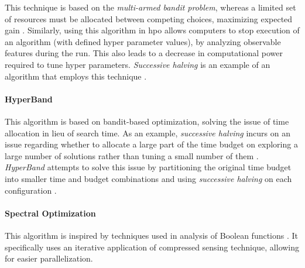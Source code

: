 This technique is based on the \textit{multi-armed bandit problem}, whereas a limited set of resources must be allocated between competing choices, maximizing expected gain \parencite{Katehakis1987TheMB}. Similarly, using this algorithm in \acrshort{hpo} allows computers to stop execution of an algorithm (with defined hyper parameter values), by analyzing observable features during the run. This also leads to a decrease in computational power required to tune hyper parameters. \textit{Successive halving} is an example of an algorithm that employs this technique \parencite{jamieson2015nonstochastic}.

\paragraph{HyperBand}

This algorithm is based on bandit-based optimization, solving the issue of time allocation in lieu of search time. As an example, \textit{successive halving} incurs on an issue regarding whether to allocate a large part of the time budget on exploring a large number of solutions rather than tuning a small number of them \parencite{elshawi2019automated}. \textit{HyperBand} attempts to solve this issue by partitioning the original time budget into smaller time and budget combinations and using \textit{successive halving} on each configuration \parencite{li2016hyperband}.

\paragraph{Spectral Optimization}

This algorithm is inspired by techniques used in analysis of Boolean functions \parencite{hazan2017hyperparameter}. It specifically uses an iterative application of compressed sensing technique, allowing for easier parallelization.
